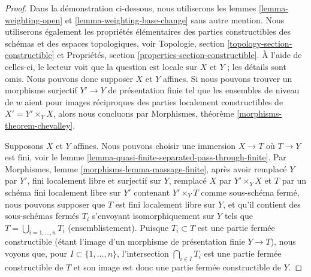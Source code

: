 \begin{proof}
Dans la démonstration ci-dessous, nous utiliserons les lemmes \ref{lemma-weighting-open} et
\ref{lemma-weighting-base-change} sans autre mention.
Nous utiliserons également les propriétés élémentaires des parties constructibles
des schémas et des espaces topologiques, voir
Topologie, section \ref{topology-section-constructible} et
Propriétés, section \ref{properties-section-constructible}.
À l'aide de celles-ci, le lecteur voit que la question est locale sur $X$ et $Y$ ;
les détails sont omis. Nous pouvons donc supposer $X$ et $Y$ affines.
Si nous pouvons trouver un morphisme surjectif $Y' \to Y$
de présentation finie tel que les ensembles de niveau de $w$
aient pour images réciproques des parties localement constructibles de $X' = Y' \times_Y X$,
alors nous concluons par Morphismes, théorème \ref{morphisms-theorem-chevalley}.

\medskip\noindent
Supposons $X$ et $Y$ affines. Nous pouvons choisir une immersion $X \to T$
où $T \to Y$ est fini, voir le
lemme \ref{lemma-quasi-finite-separated-pass-through-finite}.
Par Morphismes, lemme \ref{morphisms-lemma-massage-finite},
après avoir remplacé $Y$ par $Y'$, fini localement libre et surjectif sur $Y$,
remplacé $X$ par $Y' \times_Y X$ et $T$ par un schéma fini localement
libre sur $Y'$ contenant $Y' \times_Y T$ comme sous-schéma fermé,
nous pouvons supposer que $T$ est fini localement libre sur $Y$,
et qu'il contient des sous-schémas fermés $T_i$ s'envoyant isomorphiquement sur $Y$
tels que $T = \bigcup_{i = 1, \ldots, n} T_i$ (ensemblistement).
Puisque $T_i \subset T$ est une partie fermée constructible (étant l'image
d'un morphisme de présentation finie $Y \to T$), nous voyons
que, pour $I \subset \{1, \ldots, n\}$, l'intersection
$\bigcap_{i \in I} T_i$ est une partie fermée constructible de $T$
et son image est donc une partie fermée constructible de $Y$.


\end{proof}
